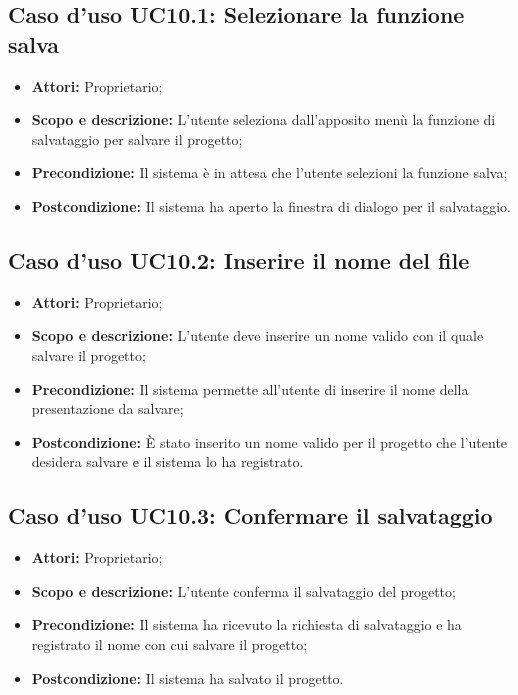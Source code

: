 \subsection{Caso d'uso UC10.1: Selezionare la funzione salva}
\begin{itemize}
	\item \textbf{Attori:} Proprietario;
	\item \textbf{Scopo e descrizione:} L'utente seleziona dall'apposito menù la funzione di salvataggio per salvare il progetto;
	\item \textbf{Precondizione:} Il sistema è in attesa che l'utente selezioni la funzione salva;
	\item \textbf{Postcondizione:} Il sistema ha aperto la finestra di dialogo per il salvataggio.
\end{itemize}


\subsection{Caso d'uso UC10.2: Inserire il nome del file}
\begin{itemize}
	\item \textbf{Attori:} Proprietario;
	\item \textbf{Scopo e descrizione:} L'utente deve inserire un nome valido con il quale salvare il progetto;
	\item \textbf{Precondizione:} Il sistema permette all'utente di inserire il nome della presentazione da salvare;
	\item \textbf{Postcondizione:} È stato inserito un nome valido per il progetto che l'utente desidera salvare e il sistema lo ha registrato.
\end{itemize}


\subsection{Caso d'uso UC10.3: Confermare il salvataggio}
\begin{itemize}
	\item \textbf{Attori:} Proprietario;
	\item \textbf{Scopo e descrizione:} L'utente conferma il salvataggio del progetto;
	\item \textbf{Precondizione:} Il sistema ha ricevuto la richiesta di salvataggio e ha registrato il nome con cui salvare il progetto;
	\item \textbf{Postcondizione:} Il sistema ha salvato il progetto.
\end{itemize}
\newpage
